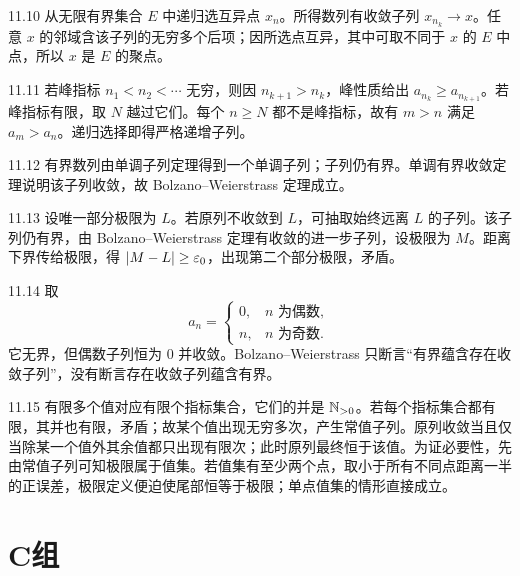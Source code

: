 \begin{solution}{11.10}
从无限有界集合 \(E\) 中递归选互异点 \(x_n\)。所得数列有收敛子列
\(x_{n_k}\to x\)。任意 \(x\) 的邻域含该子列的无穷多个后项；因所选点互异，其中可取不同于 \(x\) 的 \(E\) 中点，所以 \(x\) 是 \(E\) 的聚点。
\end{solution}

\begin{solution}{11.11}
若峰指标 \(n_1<n_2<\cdots\) 无穷，则因 \(n_{k+1}>n_k\)，峰性质给出
\(a_{n_k}\ge a_{n_{k+1}}\)。若峰指标有限，取 \(N\) 越过它们。每个 \(n\ge N\) 都不是峰指标，故有 \(m>n\) 满足 \(a_m>a_n\)。递归选择即得严格递增子列。
\end{solution}

\begin{solution}{11.12}
有界数列由单调子列定理得到一个单调子列；子列仍有界。单调有界收敛定理说明该子列收敛，故 Bolzano--Weierstrass 定理成立。
\end{solution}

\begin{solution}{11.13}
设唯一部分极限为 \(L\)。若原列不收敛到 \(L\)，可抽取始终远离 \(L\) 的子列。该子列仍有界，由 Bolzano--Weierstrass 定理有收敛的进一步子列，设极限为 \(M\)。距离下界传给极限，得 \(\left|M-L\right|\ge\varepsilon_0\)，出现第二个部分极限，矛盾。
\end{solution}

\begin{solution}{11.14}
取
\[
 a_n=\begin{cases}0,&n\text{ 为偶数},\\ n,&n\text{ 为奇数}.\end{cases}
\]
它无界，但偶数子列恒为 \(0\) 并收敛。Bolzano--Weierstrass 只断言“有界蕴含存在收敛子列”，没有断言存在收敛子列蕴含有界。
\end{solution}

\begin{solution}{11.15}
有限多个值对应有限个指标集合，它们的并是 \(\mathbb{N}_{>0}\)。若每个指标集合都有限，其并也有限，矛盾；故某个值出现无穷多次，产生常值子列。原列收敛当且仅当除某一个值外其余值都只出现有限次；此时原列最终恒于该值。为证必要性，先由常值子列可知极限属于值集。若值集有至少两个点，取小于所有不同点距离一半的正误差，极限定义便迫使尾部恒等于极限；单点值集的情形直接成立。
\end{solution}

\section*{C组}

